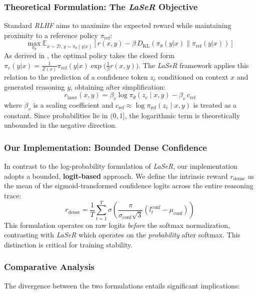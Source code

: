 \documentclass[a4paper,oneside,10pt,ngerman,english]{scrartcl}
\begin{document}
\subsubsection{Theoretical Formulation: The \textit{LaSeR} Objective}
Standard \textit{RLHF} aims to maximize the expected reward while maintaining proximity to a reference policy $\pi_{\mathrm{ref}}$:
\begin{equation}
	\max_{\pi_\theta} \mathbb{E}_{x \sim \mathcal{D},\, y \sim \pi_\theta(y|x)} \left[ r(x, y) - \beta\, D_{\mathrm{KL}}\!\left(\pi_\theta(y|x) \| \pi_{\mathrm{ref}}(y|x)\right) \right]
\end{equation}
As derived in \citet{directpreferenceopt}, the optimal policy takes the closed form $\pi_r(y|x) = \frac{1}{Z(x)}\pi_{\mathrm{ref}}(y|x)\exp\!\bigl(\frac{1}{\beta}r(x,y)\bigr)$. The \textit{LaSeR} framework \citep{laser} applies this relation to the prediction of a confidence token $z_c$ conditioned on context $x$ and generated reasoning $y$, obtaining after simplification:
\begin{equation}
	r_{\mathrm{laser}}(x, y) = \beta_v \log \pi_\theta(z_c \mid x, y) - \beta_v\, c_{\mathrm{ref}}
\end{equation}
where $\beta_v$ is a scaling coefficient and $c_{\mathrm{ref}} \approx \log \pi_{\mathrm{ref}}(z_c \mid x,y)$ is treated as a constant. Since probabilities lie in $(0,1]$, the logarithmic term is theoretically unbounded in the negative direction.

\subsubsection{Our Implementation: Bounded Dense Confidence}
In contrast to the log-probability formulation of \textit{LaSeR}, our implementation adopts a bounded, \textbf{logit-based} approach. We define the intrinsic reward $r_{\mathrm{dense}}$ as the mean of the sigmoid-transformed confidence logits across the entire reasoning trace:
\begin{equation}
	r_{\mathrm{dense}} = \frac{1}{T} \sum_{t=1}^{T} \sigma\!\left( \frac{\pi}{\sigma_{\mathrm{conf}}\sqrt{3}} \left(l_{t}^{\mathrm{conf}} - \mu_{\mathrm{conf}}\right) \right)
\end{equation}
This formulation operates on raw logits \textit{before} the softmax normalization, contrasting with \textit{LaSeR} which operates on the \textit{probability} after softmax. This distinction is critical for training stability.

\subsubsection{Comparative Analysis}
\label{sec:interference}
The divergence between the two formulations entails significant implications:
\end{document}

